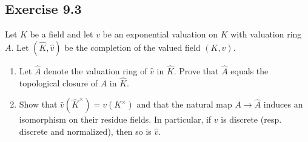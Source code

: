 \documentclass[12pt, a4paper]{article}
\begin{document}
\subsection*{Exercise 9.3}
 Let $K$ be a field and let $v$ be an exponential valuation on $K$ with valuation ring $A$. Let $(\hat{K}, \hat{v})$ be the completion of the valued field $(K, v)$.
\begin{enumerate}
    \item Let $\hat{A}$ denote the valuation ring of $\hat{v}$ in $\hat{K}$. Prove that $\hat{A}$ equals the topological closure of $A$ in $\hat{K}$.
    \item Show that $\hat{v}(\hat{K}^\times) = v(K^\times)$ and that the natural map $A \to \hat{A}$ induces an isomorphism on their residue fields. In particular, if $v$ is discrete (resp. discrete and normalized), then so is $\hat{v}$.
\end{enumerate}
\end{document}
